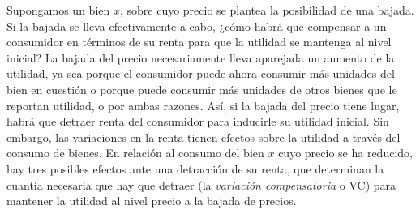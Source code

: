 \documentclass{nuevotema}
\begin{document}
Supongamos un bien $x$, sobre cuyo precio se plantea la posibilidad de una bajada. Si la bajada se lleva efectivamente a cabo, ¿cómo habrá que compensar a un consumidor en términos de su renta para que la utilidad se mantenga al nivel inicial? La bajada del precio necesariamente lleva aparejada un aumento de la utilidad, ya sea porque el consumidor puede ahora consumir más unidades del bien en cuestión o porque puede consumir más unidades de otros bienes que le reportan utilidad, o por ambas razones. Así, si la bajada del precio tiene lugar, habrá que detraer renta del consumidor para inducirle su utilidad inicial. Sin embargo, las variaciones en la renta tienen efectos sobre la utilidad a través del consumo de bienes. En relación al consumo del bien $x$ cuyo precio se ha reducido, hay tres posibles efectos ante una detracción de su renta, que determinan la cuantía necesaria que hay que detraer (la \textit{variación compensatoria} o VC) para mantener la utilidad al nivel precio a la bajada de precios.
\end{document}
